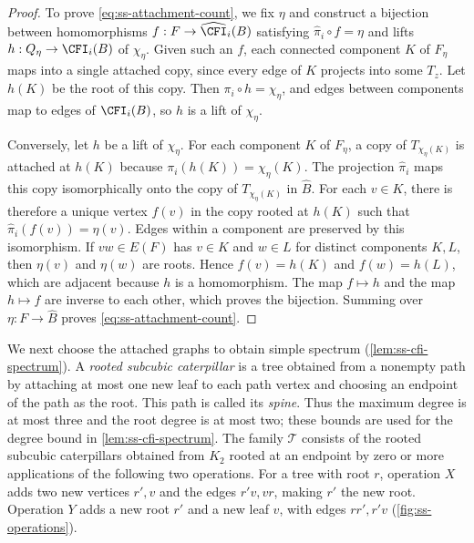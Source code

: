 \begin{proof}
To prove \cref{eq:ss-attachment-count}, we fix $\eta$ and construct a
bijection between homomorphisms
$f:F\to\widehat{\CFI}_i(B)$ satisfying $\widehat\pi_i\circ f=\eta$
and lifts $h:Q_\eta\to\CFI_i(B)$ of $\chi_\eta$.
Given such an $f$, each connected component $K$ of $F_\eta$ maps
into a single attached copy, since every edge of $K$ projects into some
$T_z$. Let $h(K)$ be the root of this copy.
Then $\pi_i\circ h=\chi_\eta$, and edges between components map to edges
of $\CFI_i(B)$, so $h$ is a lift of $\chi_\eta$.

Conversely, let $h$ be a lift of $\chi_\eta$.
For each component $K$ of $F_\eta$, a copy of $T_{\chi_\eta(K)}$
is attached at $h(K)$ because $\pi_i(h(K))=\chi_\eta(K)$.
The projection $\widehat\pi_i$ maps this copy isomorphically onto
the copy of $T_{\chi_\eta(K)}$ in $\widehat B$.
For each $v\in K$, there is therefore a unique vertex $f(v)$ in the
copy rooted at $h(K)$ such that $\widehat\pi_i(f(v))=\eta(v)$.
Edges within a component are preserved by this isomorphism.
If $vw\in E(F)$ has $v\in K$ and $w\in L$ for distinct components $K,L$, then $\eta(v)$ and
$\eta(w)$ are roots. Hence $f(v)=h(K)$ and $f(w)=h(L)$, which are
adjacent because $h$ is a homomorphism.
The map $f\mapsto h$ and the map $h\mapsto f$ are inverse to each
other, which proves the bijection.
Summing over $\eta:F\to\widehat B$ proves \cref{eq:ss-attachment-count}.
\end{proof}

We next choose the attached graphs to obtain simple spectrum
(\cref{lem:ss-cfi-spectrum}).
A \emph{rooted subcubic caterpillar} is a tree obtained from a nonempty path
by attaching at most one new leaf to each path vertex and choosing an
endpoint of the path as the root. This path is called its \emph{spine}.
Thus the maximum degree is at most three and
the root degree is at most two; these bounds are used for the degree
bound in \cref{lem:ss-cfi-spectrum}.
The family $\mathcal T$ consists of the rooted subcubic caterpillars
obtained from $K_2$ rooted at an endpoint by zero or more applications
of the following two operations.
For a tree with root $r$, operation $X$ adds two new vertices $r',v$
and the edges $r'v,vr$, making $r'$ the new root.
Operation $Y$ adds a new root $r'$ and a new leaf $v$, with edges
$rr',r'v$ (\cref{fig:ss-operations}).

